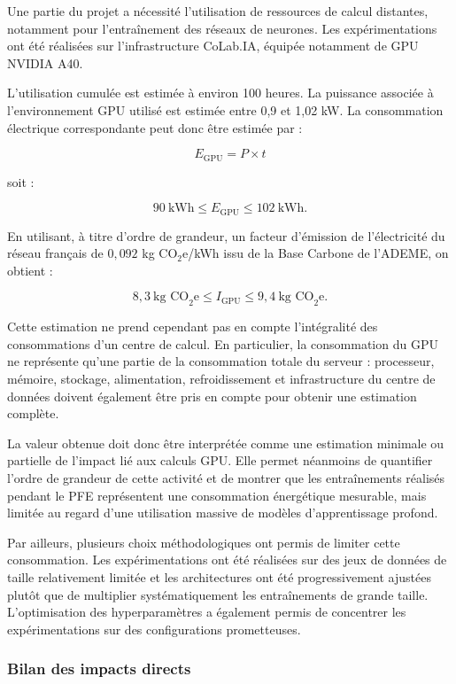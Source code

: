 \documentclass[12pt,a4paper,twoside]{article}
\begin{document}
Une partie du projet a nécessité l'utilisation de ressources de calcul distantes, notamment pour l'entraînement des réseaux de neurones. Les expérimentations ont été réalisées sur l'infrastructure CoLab.IA, équipée notamment de GPU NVIDIA A40.

L'utilisation cumulée est estimée à environ 100 heures. La puissance associée à l'environnement GPU utilisé est estimée entre 0,9 et 1,02 kW. La consommation électrique correspondante peut donc être estimée par :

$$
E_{\mathrm{GPU}} = P \times t
$$

soit :

$$
90\ \text{kWh} \leq E_{\mathrm{GPU}} \leq 102\ \text{kWh}.
$$

En utilisant, à titre d'ordre de grandeur, un facteur d'émission de l'électricité du réseau français de $0,092$ kg CO$_2$e/kWh issu de la Base Carbone de l'ADEME, on obtient :

$$
8,3\ \text{kg CO}_2\text{e}
\leq
I_{\mathrm{GPU}}
\leq
9,4\ \text{kg CO}_2\text{e}.
$$

Cette estimation ne prend cependant pas en compte l'intégralité des consommations d'un centre de calcul. En particulier, la consommation du GPU ne représente qu'une partie de la consommation totale du serveur : processeur, mémoire, stockage, alimentation, refroidissement et infrastructure du centre de données doivent également être pris en compte pour obtenir une estimation complète.

La valeur obtenue doit donc être interprétée comme une estimation minimale ou partielle de l'impact lié aux calculs GPU. Elle permet néanmoins de quantifier l'ordre de grandeur de cette activité et de montrer que les entraînements réalisés pendant le PFE représentent une consommation énergétique mesurable, mais limitée au regard d'une utilisation massive de modèles d'apprentissage profond.

Par ailleurs, plusieurs choix méthodologiques ont permis de limiter cette consommation. Les expérimentations ont été réalisées sur des jeux de données de taille relativement limitée et les architectures ont été progressivement ajustées plutôt que de multiplier systématiquement les entraînements de grande taille. L'optimisation des hyperparamètres a également permis de concentrer les expérimentations sur des configurations prometteuses.

\subsubsection{Bilan des impacts directs}
\label{subsubsec:rse_bilan_personnel}
\end{document}

